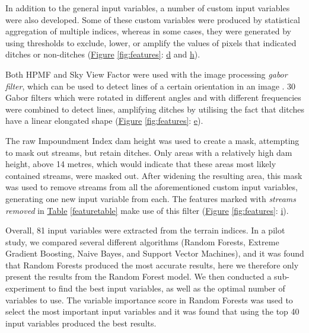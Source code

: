 \documentclass[]{interact}
\theoremstyle{plain}%
\theoremstyle{definition}
\theoremstyle{remark}
\begin{document}
In addition to the general input variables, a number of custom input variables were also developed.  Some of these custom variables were produced by statistical aggregation of multiple indices, whereas in some cases, they were generated by using thresholds to exclude, lower, or amplify the values of pixels that indicated ditches or non-ditches (\hyperref[fig:features]{Figure} \ref{fig:features}: \hyperref[fig:features]{d} and \hyperref[fig:features]{h}).

Both HPMF and Sky View Factor were used with the image processing \textit{gabor filter}, which can be used to detect lines of a certain orientation in an image \citep{gabor}. 30 Gabor filters which were rotated in different angles and with different frequencies were combined to detect lines, amplifying ditches by utilising the fact that ditches have a linear elongated shape (\hyperref[fig:features]{Figure} \ref{fig:features}: \hyperref[fig:features]{e}).

\label{impoundmentstreamremoval}
The raw Impoundment Index dam height was used to create a mask, attempting to mask out streams, but retain ditches. Only areas with a relatively high dam height, above 14 metres, which would indicate that these areas most likely contained streams, were masked out. After widening the resulting area, this mask was used to remove streams from all the aforementioned custom input variables, generating one new input variable from each. The features marked with \textit{streams removed} in \hyperref[featuretable]{Table} \ref{featuretable} make use of this filter (\hyperref[fig:features]{Figure} \ref{fig:features}: \hyperref[fig:features]{i}).

Overall, 81 input variables were extracted from the terrain indices. In a pilot study, we compared several different algorithms (Random Forests, Extreme Gradient Boosting, Naive Bayes, and Support Vector Machines), and it was found that Random Forests produced the most accurate results, here we therefore only present the results from the Random Forest model. We then conducted a sub-experiment to find the best input variables, as well as the optimal number of variables to use. The variable importance score in Random Forests was used to select the most important input variables and it was found that using the top 40 input variables produced the best results.
\end{document}
